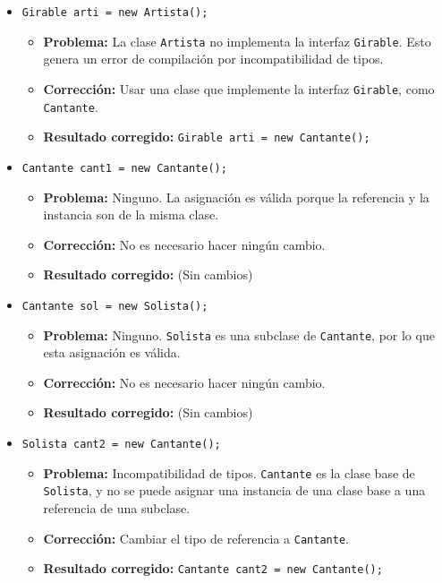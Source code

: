 \documentclass[a4paper,12pt]{article}
\begin{document}
    \begin{itemize}
        \item \texttt{Girable arti = new Artista();}
            \begin{itemize}
                \item \textbf{Problema:} La clase \texttt{Artista} no implementa la interfaz \texttt{Girable}. Esto genera un error de compilación por incompatibilidad de tipos.
                \item \textbf{Corrección:} Usar una clase que implemente la interfaz \texttt{Girable}, como \texttt{Cantante}.
                \item \textbf{Resultado corregido:} \texttt{Girable arti = new Cantante();}
            \end{itemize}

        \item \texttt{Cantante cant1 = new Cantante();}
            \begin{itemize}
                \item \textbf{Problema:} Ninguno. La asignación es válida porque la referencia y la instancia son de la misma clase.
                \item \textbf{Corrección:} No es necesario hacer ningún cambio.
                \item \textbf{Resultado corregido:} (Sin cambios)
            \end{itemize}

        \item \texttt{Cantante sol = new Solista();}
            \begin{itemize}
                \item \textbf{Problema:} Ninguno. \texttt{Solista} es una subclase de \texttt{Cantante}, por lo que esta asignación es válida.
                \item \textbf{Corrección:} No es necesario hacer ningún cambio.
                \item \textbf{Resultado corregido:} (Sin cambios)
            \end{itemize}

        \item \texttt{Solista cant2 = new Cantante();}
            \begin{itemize}
                \item \textbf{Problema:} Incompatibilidad de tipos. \texttt{Cantante} es la clase base de \texttt{Solista}, y no se puede asignar una instancia de una clase base a una referencia de una subclase.
                \item \textbf{Corrección:} Cambiar el tipo de referencia a \texttt{Cantante}.
                \item \textbf{Resultado corregido:} \texttt{Cantante cant2 = new Cantante();}
            \end{itemize}


\end{itemize}
\end{document}
